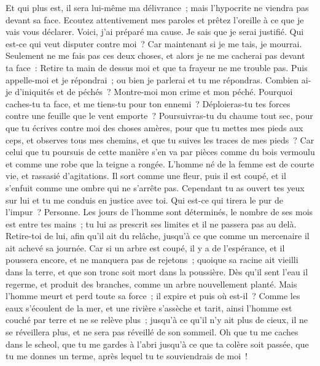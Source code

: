 \begin{multicols}{2}
Et qui plus est, il sera lui-même ma délivrance~; mais l'hypocrite ne viendra pas devant sa face.
Ecoutez attentivement mes paroles et prêtez l'oreille à ce que je vais vous déclarer. 
Voici, j'ai préparé ma cause. Je sais que je serai justifié.
Qui est-ce qui veut disputer contre moi~? Car maintenant si je me tais, je mourrai. 
Seulement ne me fais pas ces deux choses, et alors je ne me cacherai pas devant ta face~:
Retire ta main de dessus moi et que ta frayeur ne me trouble pas.
Puis appelle-moi et je répondrai~; ou bien je parlerai et tu me répondras. 
Combien ai-je d'iniquités et de péchés~? Montre-moi mon crime et mon péché. 
Pourquoi caches-tu ta face, et me tiens-tu pour ton ennemi~?
Déploieras-tu tes forces contre une feuille que le vent emporte~? Poursuivras-tu du chaume tout sec,
pour que tu écrives contre moi des choses amères,
pour que tu mettes mes pieds aux ceps, et observes tous mes chemins, et que tu suives les traces de mes pieds~?
Car celui que tu poursuis de cette manière s'en va par pièces comme du bois vermoulu et comme une robe que la teigne a rongée. 
\VerseOne{}L'homme né de la femme est de courte vie, et rassasié d'agitations.
Il sort comme une fleur, puis il est coupé, et il s'enfuit comme une ombre qui ne s'arrête pas.
Cependant tu as ouvert tes yeux sur lui et tu me conduis en justice avec toi.
Qui est-ce qui tirera le pur de l'impur~? Personne.
Les jours de l'homme sont déterminés, le nombre de ses mois est entre tes mains~; tu lui as prescrit ses limites et il ne passera pas au delà.
Retire-toi de lui, afin qu'il ait du relâche, jusqu'à ce que comme un mercenaire il ait achevé sa journée.
Car si un arbre est coupé, il y a de l'espérance, et il poussera encore, et ne manquera pas de rejetons~; 
quoique sa racine ait vieilli dans la terre, et que son tronc soit mort dans la poussière.
Dès qu'il sent l'eau il regerme, et produit des branches, comme un arbre nouvellement planté. 
Mais l'homme meurt et perd toute sa force~; il expire et puis où est-il~?
Comme les eaux s'écoulent de la mer, et une rivière s'assèche et tarit,
 ainsi l'homme est couché par terre et ne se relève plus~; jusqu'à ce qu'il n'y ait plus de cieux, il ne se réveillera plus, et ne sera pas réveillé de son sommeil. 
Oh que tu me caches dans le scheol, que tu me gardes à l'abri jusqu'à ce que ta colère soit passée, que tu me donnes un terme, après lequel tu te souviendrais de moi~!

\end{multicols}
